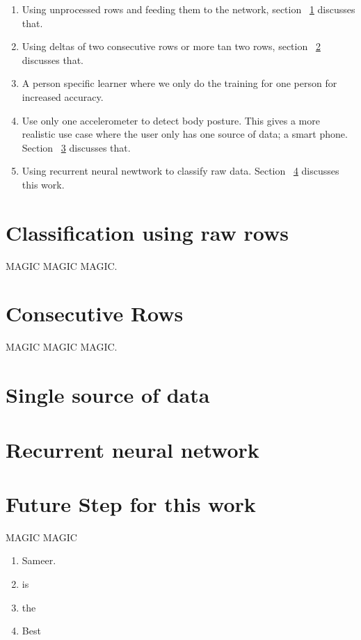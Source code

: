 \documentclass{article}
\begin{document}
\begin{enumerate}
  \item Using unprocessed rows and feeding them to the network, section ~\ref{simple_rows} discusses that.
  \item Using deltas of two consecutive  rows or more tan two rows, section ~\ref{consecutive_rows} discusses that. 
  \item A person specific learner where we only do the training for one person  for increased accuracy. 
  \item Use only one accelerometer to  detect body posture. This gives a more realistic use case where the user only 
        has one source of data; a smart phone. Section ~\ref{single_acc} discusses that.
  \item Using recurrent neural newtwork to classify raw data. Section ~\ref{rec_neural} discusses this work.
\end{enumerate}  

\section{Classification using raw rows}
\label{simple_rows}
MAGIC MAGIC MAGIC.


\section{Consecutive Rows}
\label{consecutive_rows}
MAGIC MAGIC MAGIC.

\section{Single source of data} 
\label{single_acc}

\section{Recurrent neural network}
\label{rec_neural}


\section{Future Step for this work}
MAGIC MAGIC 

\begin{enumerate}
  \item Sameer.  
  \item is  
  \item the 
  \item Best
\end{enumerate}

{}

\end{document}

